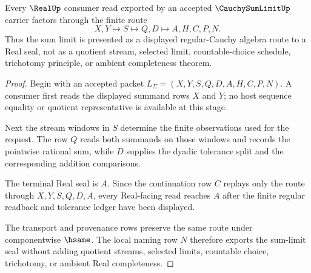 \begin{theorem}
\label{thm:cauchy-sum-limit-real-seal-route}
Every $\RealUp$ consumer read exported by an accepted $\CauchySumLimitUp$ carrier factors through the finite route
$$
X,Y \longmapsto S \longmapsto Q,D \longmapsto A,H,C,P,N .
$$
Thus the sum limit is presented as a displayed regular-Cauchy algebra route to a Real seal, not as a quotient stream, selected limit, countable-choice schedule, trichotomy principle, or ambient completeness theorem.
\end{theorem}
\begin{proof}
Begin with an accepted packet $L_{\Sigma}=(X,Y,S,Q,D,A,H,C,P,N)$. A consumer first reads the displayed summand rows $X$ and $Y$; no host sequence equality or quotient representative is available at this stage.

Next the stream windows in $S$ determine the finite observations used for the request. The row $Q$ reads both summands on those windows and records the pointwise rational sum, while $D$ supplies the dyadic tolerance split and the corresponding addition comparisons.

The terminal Real seal is $A$. Since the continuation row $C$ replays only the route through $X,Y,S,Q,D,A$, every Real-facing read reaches $A$ after the finite regular readback and tolerance ledger have been displayed.

The transport and provenance rows preserve the same route under componentwise $\hsame$. The local naming row $N$ therefore exports the sum-limit seal without adding quotient streams, selected limits, countable choice, trichotomy, or ambient Real completeness.
\end{proof}


\begin{closurestatus}{\CauchySumLimitUp}
  \theoryclosure{\seedClosure}
  \formalstatus{\unformalizedV}
\end{closurestatus}
